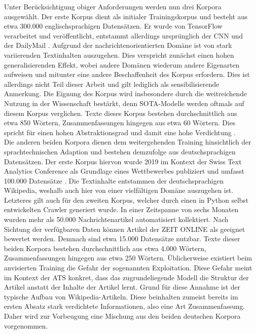 \noindent
Unter Berücksichtigung obiger Anforderungen werden nun drei Korpora ausgewählt. Der erste Korpus dient als initialer Trainingskorpus und besteht aus etwa 300.000 englischsprachigen Datensätzen. Er wurde von TensorFlow verarbeitet und veröffentlicht, entstammt allerdings ursprünglich der CNN und der DailyMail \cite{TEN21}. Aufgrund der nachrichtenorientierten Domäne ist von stark variierenden Textinhalten auszugehen. Dies verspricht zunächst einen hohen generalisierenden Effekt, wobei andere Domänen wiederum andere Eigenarten aufweisen und mitunter eine andere Beschaffenheit des Korpus erfordern. Dies ist allerdings nicht Teil dieser Arbeit und gilt lediglich als sensibilisierende Anmerkung. Die Eignung des Korpus wird insbesondere durch die weitreichende Nutzung in der Wissenschaft bestärkt, denn \ac{SOTA}-Modelle werden oftmals auf diesem Korpus verglichen. Texte dieses Korpus bestehen durchschnittlich aus etwa 850 Wörtern, Zusammenfassungen hingegen aus etwa 60 Wörtern. Dies spricht für einen hohen Abstraktionsgrad und damit eine hohe Verdichtung \cite[S.~6]{ROT20}.\\

\noindent
Die anderen beiden Korpora dienen dem weitergehenden Training hinsichtlich der sprachtechnischen Adaption und bestehen demzufolge aus deutschsprachigen Datensätzen. Der erste Korpus hiervon wurde 2019 im Kontext der Swiss Text Analytics Conference als Grundlage eines Wettbewerbes publiziert und umfasst 100.000 Datensätze \cite{CIE19}. Die Textinhalte entstammen der deutschsprachigen Wikipedia, weshalb auch hier von einer vielfältigen Domäne auszugehen ist. Letzteres gilt auch für den zweiten Korpus, welcher durch einen in Python selbst entwickelten Crawler generiert wurde. In einer Zeitspanne von sechs Monaten wurden mehr als 50.000 Nachrichtenartikel automatisiert kollektiert. Nach Sichtung der verfügbaren Daten können Artikel der ZEIT ONLINE als geeignet bewertet werden. Demnach sind etwa 15.000 Datensätze nutzbar. Texte dieser beiden Korpora bestehen durchschnittlich aus etwa 4.000 Wörtern, Zusammenfassungen hingegen aus etwa 250 Wörtern. Üblicherweise existiert beim anvisierten Training die Gefahr der sogenannten Exploitation. Diese Gefahr meint im Kontext der \ac{ATS} konkret, dass das zugrundeliegende Modell die Struktur der Artikel anstatt der Inhalte der Artikel lernt. Grund für diese Annahme ist der typische Aufbau von Wikipedia-Artikeln. Diese beinhalten zumeist bereits im ersten Absatz stark verdichtete Informationen, also eine Art Zusammenfassung. Daher wird zur Vorbeugung eine Mischung aus den beiden deutschen Korpora vorgenommen.\\

